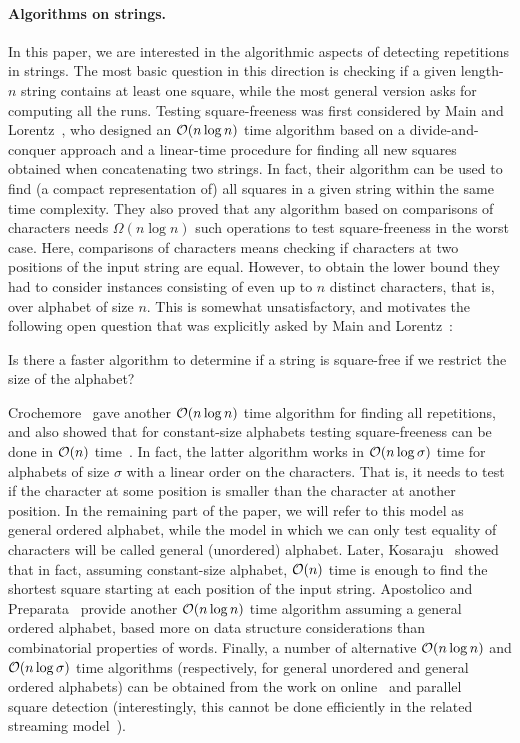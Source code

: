\paragraph{Algorithms on strings.}
In this paper, we are interested in the algorithmic aspects of detecting repetitions in strings. The most basic question
in this direction is checking if a given length-$n$ string contains at least one square,
while the most general version asks for computing all the runs.
Testing square-freeness was
first considered by Main and Lorentz~\cite{Main1984}, who designed an $\mathcal{O}(n\log n)$ time algorithm based on
a divide-and-conquer approach and a linear-time procedure for finding all new squares obtained when concatenating
two strings. In fact, their algorithm can be used to find (a compact representation of) all squares in a given string
within the same time complexity. They also proved that any algorithm based on comparisons of characters needs
$\Omega(n\log n)$ such operations to test square-freeness in the worst case. Here, comparisons of characters means
checking if characters at two positions of the input string are equal. However, to obtain the lower bound they
had to consider instances consisting of even up to $n$ distinct characters, that is, over alphabet of size $n$.
This is somewhat unsatisfactory, and motivates the following open question that was explicitly asked by Main and Lorentz~\cite{Main1984}:

\begin{question}
Is there a faster algorithm to determine if a string is square-free if we restrict the size of the alphabet?
\end{question}

Crochemore~\cite{Crochemore1981} gave another $\mathcal{O}(n\log n)$ time algorithm for finding all repetitions,
and also showed that for constant-size alphabets testing square-freeness can be done in  $\mathcal{O}(n)$ time~\cite{Crochemore1986}.
In fact, the latter algorithm works in $\mathcal{O}(n\log \sigma)$ time for alphabets of size $\sigma$ with a linear order on the characters.
That is, it needs to test if the character at some position is smaller than the character at another position.
In the remaining part of the paper, we will refer to this model as general ordered alphabet, while the model
in which we can only test equality of characters will be called general (unordered) alphabet.
Later, Kosaraju~\cite{Kosaraju1994} showed that in fact, assuming constant-size alphabet, $\mathcal{O}(n)$ time is enough
to find the shortest square starting at each position of the input string.
Apostolico and Preparata~\cite{Apostolico1983} provide another $\mathcal{O}(n\log n)$ time algorithm assuming a general ordered alphabet,
based more on data structure considerations than combinatorial properties of words.
Finally, a number of alternative $\mathcal{O}(n\log n)$ and $\mathcal{O}(n\log \sigma)$ time algorithms (respectively, for general unordered
and general ordered alphabets) can be obtained from the work on online~\cite{Hong2008,Kosolobov2014,Kosolobov2015a}
and parallel~\cite{Apostolico1996} square detection (interestingly, this cannot be done efficiently in the related
streaming model~\cite{Merkurev2019,Merkurev2022}).

